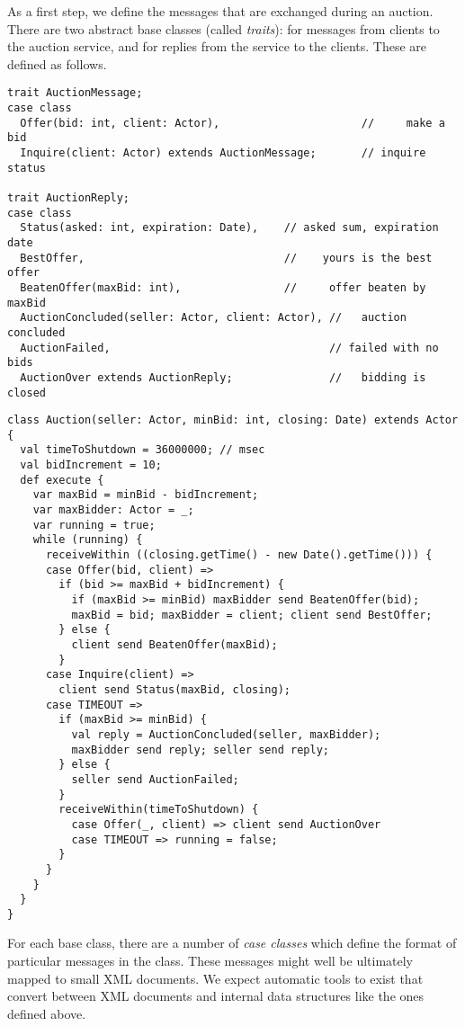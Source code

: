 \documentclass[a4paper,12pt,twoside,titlepage]{book}
\begin{document}
As a first step, we define the messages that are exchanged during an
auction. There are two abstract base classes (called {\em traits}):
 for messages from clients to the auction
service, and  for replies from the service to the
clients.  These are defined as follows.
\begin{lstlisting}
trait AuctionMessage;
case class 
  Offer(bid: int, client: Actor),                      //     make a bid
  Inquire(client: Actor) extends AuctionMessage;       // inquire status

trait AuctionReply;
case class
  Status(asked: int, expiration: Date),    // asked sum, expiration date
  BestOffer,                               //    yours is the best offer
  BeatenOffer(maxBid: int),                //     offer beaten by maxBid
  AuctionConcluded(seller: Actor, client: Actor), //   auction concluded
  AuctionFailed,                                  // failed with no bids
  AuctionOver extends AuctionReply;               //   bidding is closed
\end{lstlisting}

\begin{lstlisting}[style=floating,label=fig:simple-auction,caption=Implementation of an Auction Service]
class Auction(seller: Actor, minBid: int, closing: Date) extends Actor {
  val timeToShutdown = 36000000; // msec
  val bidIncrement = 10;
  def execute {
    var maxBid = minBid - bidIncrement;
    var maxBidder: Actor = _;
    var running = true;
    while (running) {
      receiveWithin ((closing.getTime() - new Date().getTime())) {
	  case Offer(bid, client) =>
	    if (bid >= maxBid + bidIncrement) { 
          if (maxBid >= minBid) maxBidder send BeatenOffer(bid);
          maxBid = bid; maxBidder = client; client send BestOffer;
        } else {
          client send BeatenOffer(maxBid);
        }
	  case Inquire(client) =>
	    client send Status(maxBid, closing);
	  case TIMEOUT =>
	    if (maxBid >= minBid) {
	      val reply = AuctionConcluded(seller, maxBidder);
	      maxBidder send reply; seller send reply;
	    } else {
	      seller send AuctionFailed;
        }
        receiveWithin(timeToShutdown) {
          case Offer(_, client) => client send AuctionOver
          case TIMEOUT => running = false;
        }
      }
    }
  }
}
\end{lstlisting}

For each base class, there are a number of {\em case classes} which
define the format of particular messages in the class. These messages
might well be ultimately mapped to small XML documents. We expect
automatic tools to exist that convert between XML documents and
internal data structures like the ones defined above.
\end{document}
